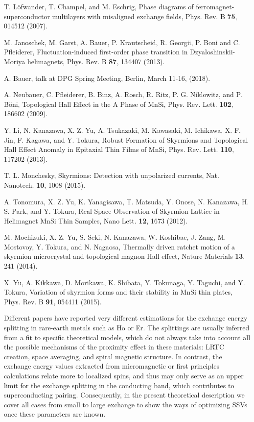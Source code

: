 \documentclass[prb,amsmath,amssymb,reprint]{revtex4-2}
\begin{document}
\begin{thebibliography}{99}
 T. L\"{o}fwander, T. Champel, and M. Eschrig,
Phase diagrams of ferromagnet-superconductor multilayers with misaligned exchange fields,
Phys.
Rev. B \textbf{75}, 014512 (2007).

M. Janoschek, M. Garst, A. Bauer, P. Krautscheid, R. Georgii, P. Boni
and C. Pfleiderer,
Fluctuation-induced first-order phase transition in Dzyaloshinskii-Moriya helimagnets,
Phys. Rev. B \textbf{87}, 134407 (2013).

 A. Bauer, talk at DPG Spring Meeting, Berlin, March 11-16,
(2018).

 A. Neubauer, C. Pfleiderer, B. Binz, A. Rosch, R. Ritz, P. G. Niklowitz, and P. B\"{o}ni,
Topological Hall Effect in the A Phase of MnSi,
Phys. Rev. Lett. \textbf{102}, 186602
(2009).

 Y. Li, N. Kanazawa, X. Z. Yu, A. Tsukazaki, M. Kawasaki, M. Ichikawa, X. F. Jin, F. Kagawa, and Y. Tokura,
Robust Formation of Skyrmions and Topological Hall Effect Anomaly in Epitaxial Thin Films of MnSi,
Phys. Rev. Lett. \textbf{110}, 117202 (2013).

 T. L. Monchesky,
Skyrmions: Detection with unpolarized currents,
Nat. Nanotech. \textbf{10}, 1008 (2015).

 A. Tonomura, X. Z. Yu, K. Yanagisawa, T. Matsuda, Y.
Onose, N. Kanazawa, H. S. Park, and Y. Tokura,
Real-Space Observation of Skyrmion Lattice in Helimagnet MnSi Thin Samples,
Nano Lett. \textbf{12}, 1673 (2012).

 M. Mochizuki, X. Z. Yu, S. Seki, N. Kanazawa, W.
Koshibae, J. Zang, M. Mostovoy, Y. Tokura, and N. Nagaosa,
Thermally driven ratchet motion of a skyrmion microcrystal and topological magnon Hall effect,
Nature Materials \textbf{13}, 241 (2014).

 X. Yu, A. Kikkawa, D. Morikawa, K. Shibata, Y. Tokunaga, Y.
Taguchi, and Y. Tokura,
Variation of skyrmion forms and their stability in MnSi thin plates,
Phys. Rev. B \textbf{91}, 054411 (2015).


Different papers \cite{Chiodi2013,Halasz2009,Gu2015,Satchell2017} have reported very different estimations for the exchange energy splitting in rare-earth metals such as  Ho or Er. The splittings  are usually inferred from a fit to specific theoretical models, which do not always take into account all the possible mechanisms of the proximity effect in these materials: LRTC creation, space averaging, and spiral magnetic structure. In contrast, the exchange energy values extracted from micromagnetic or first principles calculations relate more to localized spins, and thus may only serve  as an upper limit for the exchange splitting in the conducting band, which  contributes to superconducting pairing. Consequently, in the present theoretical description we cover all cases from small to large exchange to show the ways of optimizing SSVs once these parameters are known.



\end{thebibliography}
\end{document}
